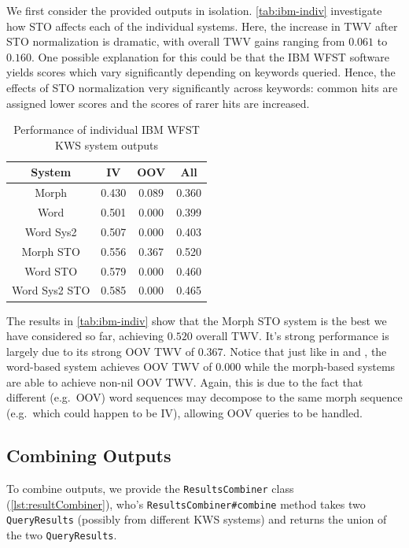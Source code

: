 \documentclass[a4paper,oneside,reqno]{amsart}
\begin{document}
We first consider the provided outputs in isolation.  \autoref{tab:ibm-indiv}
investigate how STO affects each of the individual systems.  Here, the increase
in TWV after STO normalization is dramatic, with overall TWV gains ranging from
$0.061$ to $0.160$. One possible explanation for this could be that the IBM
WFST software yields scores which vary significantly depending on keywords
queried. Hence, the effects of STO normalization very significantly across
keywords: common hits are assigned lower scores and the scores of rarer hits
are increased.

\begin{table}[ht!]
  \begin{tabular}{cccc}
    \toprule
    System        & IV    & OOV   & All \\
    \midrule
    Morph         & 0.430 & 0.089 & 0.360 \\
    Word          & 0.501 & 0.000 & 0.399 \\
    Word Sys2     & 0.507 & 0.000 & 0.403 \\
    \hline
    Morph STO     & 0.556 & 0.367 & 0.520 \\
    Word STO      & 0.579 & 0.000 & 0.460 \\
    Word Sys2 STO & 0.585 & 0.000 & 0.465 \\
    \bottomrule
  \end{tabular}
  \caption{Performance of individual IBM WFST KWS system outputs}
  \label{tab:ibm-indiv}
\end{table}

The results in \autoref{tab:ibm-indiv} show that the Morph STO system
is the best we have considered so far, achieving $0.520$ overall TWV\@.
It's strong performance is largely due to its strong OOV TWV of $0.367$.
Notice that just like in \label{tab:word} and \label{tab:morph}, the word-based
system achieves OOV TWV of $0.000$ while the morph-based systems are able to
achieve non-nil OOV TWV\@. Again, this is due to the fact that different (e.g.\
OOV) word sequences may decompose to the same morph sequence (e.g.\ which could
happen to be IV), allowing OOV queries to be handled.

\subsection{Combining Outputs}

To combine outputs, we provide the \texttt{ResultsCombiner} class (\autoref{lst:resultCombiner}),
who's \texttt{ResultsCombiner\#combine} method takes two \texttt{QueryResults} (possibly
from different KWS systems) and returns the union of the two \texttt{QueryResults}.
\end{document}
